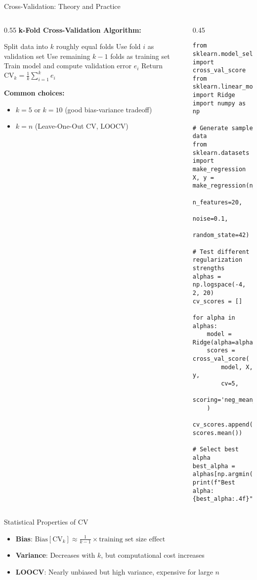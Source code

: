 \documentclass[aspectratio=169,11pt]{beamer}
\begin{document}
\begin{frame}[fragile]{Cross-Validation: Theory and Practice}
\begin{columns}
\begin{column}[t]{0.55\textwidth}
\textbf{k-Fold Cross-Validation Algorithm:}

\begin{algorithm}[H]
\caption{k-Fold Cross-Validation}
\begin{algorithmic}[1]
\STATE Split data into $k$ roughly equal folds
\STATE Use fold $i$ as validation set
\STATE Use remaining $k-1$ folds as training set
\STATE Train model and compute validation error $e_i$
\ENDFOR
\STATE Return $\text{CV}_k = \frac{1}{k}\sum_{i=1}^k e_i$
\end{algorithmic}
\end{algorithm}

\textbf{Common choices:}
\begin{itemize}
\item $k = 5$ or $k = 10$ (good bias-variance tradeoff)
\item $k = n$ (Leave-One-Out CV, LOOCV)
\end{itemize}
\end{column}
\begin{column}[t]{0.45\textwidth}
\begin{lstlisting}[basicstyle=\ttfamily\tiny]
from sklearn.model_selection import cross_val_score
from sklearn.linear_model import Ridge
import numpy as np

# Generate sample data
from sklearn.datasets import make_regression
X, y = make_regression(n_samples=100, 
                       n_features=20, 
                       noise=0.1,
                       random_state=42)

# Test different regularization strengths
alphas = np.logspace(-4, 2, 20)
cv_scores = []

for alpha in alphas:
    model = Ridge(alpha=alpha)
    scores = cross_val_score(
        model, X, y, 
        cv=5, 
        scoring='neg_mean_squared_error'
    )
    cv_scores.append(-scores.mean())

# Select best alpha
best_alpha = alphas[np.argmin(cv_scores)]
print(f"Best alpha: {best_alpha:.4f}")
\end{lstlisting}
\end{column}
\end{columns}

\begin{block}{Statistical Properties of CV}
\begin{itemize}
\item \textbf{Bias}: $\text{Bias}[\text{CV}_k] \approx \frac{1}{k-1} \times \text{training set size effect}$
\item \textbf{Variance}: Decreases with $k$, but computational cost increases
\item \textbf{LOOCV}: Nearly unbiased but high variance, expensive for large $n$
\end{itemize}
\end{block}
\end{frame}
\end{document}
